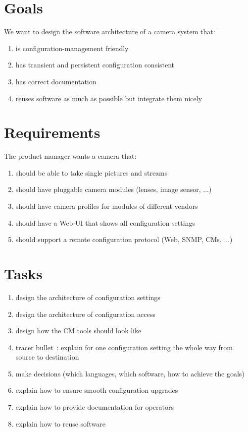 \section{Goals}

We want to design the software architecture of a camera system that:

\begin{enumerate}
	\item is configuration-management friendly
	\item has transient and persistent configuration consistent
	\item has correct documentation
	\item reuses software as much as possible but integrate them nicely
\end{enumerate}

\section{Requirements}

The product manager wants a camera that:

\begin{enumerate}
	\item should be able to take single pictures and streams
	\item should have pluggable camera modules (lenses, image sensor, ...)
	\item should have camera profiles for modules of different vendors
	\item should have a Web-UI that shows all configuration settings
	\item should support a remote configuration protocol (Web, SNMP, CMs, ...)
\end{enumerate}

\section{Tasks}

\begin{enumerate}
	\item design the architecture of configuration settings
	\item design the architecture of configuration access
	\item design how the CM tools should look like
	\item tracer bullet~\cite{hunt1999pragmatic}: explain for one configuration setting the whole way from source to destination
	\item make decisions (which languages, which software, how to achieve the goals)
	\item explain how to ensure smooth configuration upgrades
	\item explain how to provide documentation for operators
	\item explain how to reuse software
\end{enumerate}



\begingroup
\sloppy
\makeatletter
\g@addto@macro{\UrlBreaks}{\UrlOrds}
\makeatother

\endgroup








